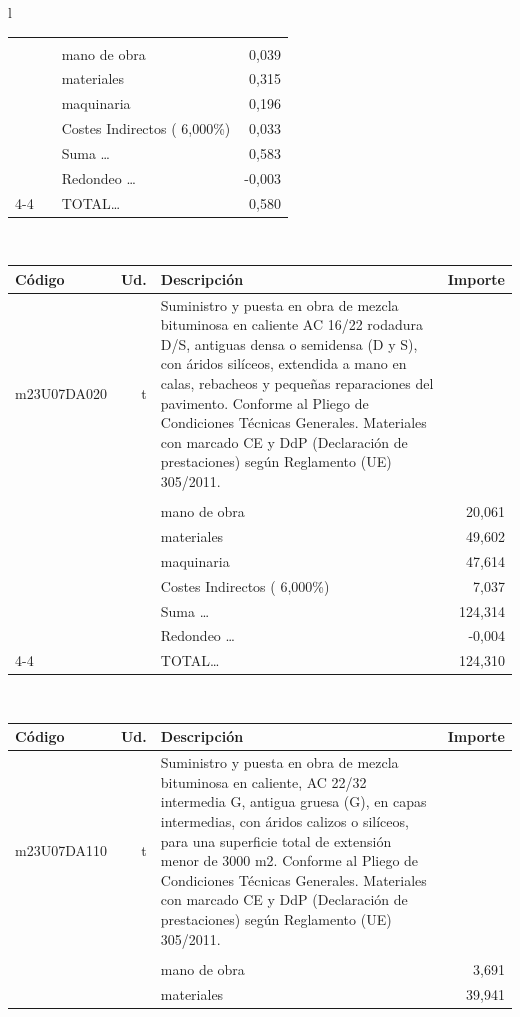 \documentclass{book}%
\begin{document}
\begin{longtable}{l}
\begin{tabular}{l r p{60mm} r}
&&&\\%
&&mano de obra&     0,039\\%
&&materiales&     0,315\\%
&&maquinaria&     0,196\\%
&&Costes Indirectos (     6,000\%)&     0,033\\%
&&Suma \ldots&     0,583\\%
&&Redondeo \ldots&    {-}0,003\\%
\cline{4-4}%
&&TOTAL\ldots&     0,580\\%
\end{tabular}\\%
\begin{tabular}{l r p{60mm} r}%
Código&Ud.&Descripción&Importe\\%
\hline%
m23U07DA020&t&Suministro y puesta en obra de mezcla bituminosa en caliente AC 16/22 rodadura D/S, antiguas densa o semidensa (D y S), con áridos silíceos, extendida a mano en calas, rebacheos y pequeñas reparaciones del pavimento. Conforme al Pliego de Condiciones Técnicas Generales. Materiales con marcado CE y DdP (Declaración de prestaciones) según Reglamento (UE) 305/2011.&\\%
&&&\\%
&&mano de obra&    20,061\\%
&&materiales&    49,602\\%
&&maquinaria&    47,614\\%
&&Costes Indirectos (     6,000\%)&     7,037\\%
&&Suma \ldots&   124,314\\%
&&Redondeo \ldots&    {-}0,004\\%
\cline{4-4}%
&&TOTAL\ldots&   124,310\\%
\end{tabular}\\%
\begin{tabular}{l r p{60mm} r}%
Código&Ud.&Descripción&Importe\\%
\hline%
m23U07DA110&t&Suministro y puesta en obra de mezcla bituminosa en caliente, AC 22/32 intermedia G, antigua gruesa (G), en capas intermedias, con áridos calizos o silíceos, para una superficie total de extensión menor de 3000 m2. Conforme al Pliego de Condiciones Técnicas Generales. Materiales con marcado CE y DdP (Declaración de prestaciones) según Reglamento (UE) 305/2011.&\\%
&&&\\%
&&mano de obra&     3,691\\%
&&materiales&    39,941\\%

\end{tabular}
\end{longtable}
\end{document}
